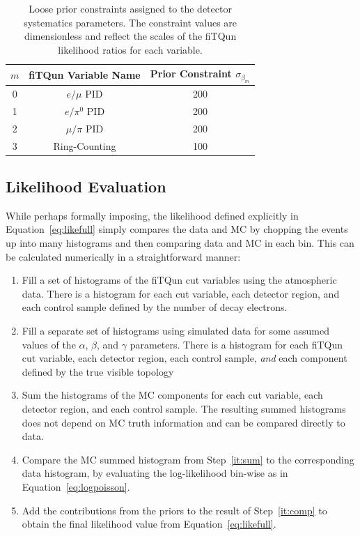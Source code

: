 \begin{table}[h]
  \centering
  \begin{tabular}{c|c|c}
   \hline\hline
   $m$ & fiTQun Variable Name & Prior Constraint $\sigma_{\beta_{m}}$ \\
   \hline\hline
   0 & $e/\mu$ PID & 200 \\
   1 & $e/\pi^{0}$ PID & 200 \\
   2 & $\mu/\pi$ PID & 200 \\
   3 & Ring-Counting &100 \\
   \hline\hline
  \end{tabular}
  \caption{Loose prior constraints assigned to the detector systematics parameters. The
  constraint values are dimensionless and reflect the scales of the fiTQun likelihood ratios
  for each variable.}
  \label{tab:betaprior}
\end{table}




\subsection{Likelihood Evaluation}
\label{subsec:evalike}

While perhaps formally imposing, the likelihood defined explicitly in
Equation~\ref{eq:likefull} simply compares the data and MC by chopping the
events up into many histograms and then comparing data and MC in each bin.
This can be calculated numerically in a straightforward manner:

\begin{enumerate}
  \item \label{it:first} Fill a set of histograms of the fiTQun cut variables using the atmospheric data.
    There is a histogram for each cut variable, each detector region,
    and each control sample defined by the number of decay electrons.
  \item
    Fill a separate set of histograms using simulated data for some assumed
    values of the $\alpha$, $\beta$, and $\gamma$ parameters. There is a
    histogram for each fiTQun cut variable, each detector region, each control
    sample, \emph{and} each component defined by the true visible topology
  \item \label{it:sum} Sum the histograms of the MC components for each cut
    variable, each detector region, and each control sample. The resulting summed histograms
    does not depend on MC truth information and can be compared directly to data.
  \item
    \label{it:comp} Compare the MC summed histogram from Step~\ref{it:sum} to
    the corresponding data histogram, by evaluating the log-likelihood bin-wise
    as in Equation~\ref{eq:logpoisson}. 
  \item Add the contributions from the
    priors to the result of Step~\ref{it:comp} to obtain the final likelihood
    value from Equation~\ref{eq:likefull}.
\end{enumerate}

